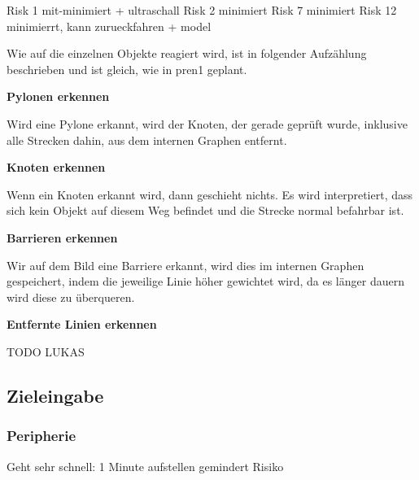 Risk 1 mit-minimiert + ultraschall
Risk 2 minimiert
Risk 7 minimiert
Risk 12 minimierrt, kann zurueckfahren + model

Wie auf die einzelnen Objekte reagiert wird, ist in folgender Aufzählung beschrieben und ist gleich, wie in \acrshort{pren1} geplant.

\textbf{Pylonen erkennen}

Wird eine Pylone erkannt, wird der Knoten, der gerade geprüft wurde, inklusive alle Strecken dahin, aus dem internen Graphen entfernt.

\textbf{Knoten erkennen}

Wenn ein Knoten erkannt wird, dann geschieht nichts. Es wird interpretiert, dass sich kein Objekt auf diesem Weg befindet und die Strecke normal befahrbar ist.

\textbf{Barrieren erkennen}

Wir auf dem Bild eine Barriere erkannt, wird dies im internen Graphen gespeichert, indem die jeweilige Linie höher gewichtet wird, da es länger dauern wird diese zu überqueren.

\textbf{Entfernte Linien erkennen}

TODO LUKAS

\newpage
\subsection{Zieleingabe}

\subsubsection{Peripherie}
\label{zieleingabe}

Geht sehr schnell: 1 Minute aufstellen gemindert Risiko